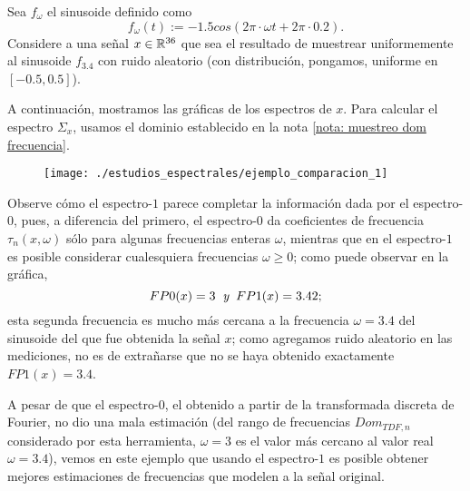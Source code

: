 \begin{ejemplo}
\label{ej: espectros comparacion}

Sea $f_{\omega}$
el sinusoide definido como
\begin{equation}
\label{eq: sinusoide eje}
f_{\omega}(t) := -1.5 cos (2 \pi \cdot \omega t + 2 \pi \cdot 0.2).
\end{equation}
Considere a una señal $x \in \mathbb{R}^{36}$ que sea el resultado
de muestrear uniformemente al sinusoide
$f_{3.4}$
con ruido aleatorio 
(con distribución, pongamos, uniforme en $[-0.5, 0.5]$).

A continuación, mostramos las gráficas
de los espectros de $x$. Para
calcular el espectro $\Sigma_{x}$,
usamos el dominio
establecido en la nota 
\ref{nota: muestreo dom frecuencia}.

\begin{figure}[H]
\centering
    \texttt{[image: ./estudios\_espectrales/ejemplo\_comparacion\_1]}
\end{figure}


Observe cómo el espectro-$1$ parece completar la información
dada por el espectro-$0$, pues, a diferencia del primero,
el espectro-$0$
da coeficientes de frecuencia $\tau_{n}(x, \omega)$ sólo
para algunas frecuencias enteras $\omega$, mientras que en el espectro-$1$
es posible considerar cualesquiera frecuencias $\omega \geq 0$; como puede observar
en la gráfica, 
\[
FP0 (x) = 3 \hspace{0.2cm} \textit{y} \hspace{0.2cm}
FP1 (x) = 3.42;
\]
esta segunda frecuencia es mucho más cercana a
la frecuencia $\omega =3.4$ del sinusoide del que
fue obtenida la señal $x$; como agregamos ruido
aleatorio en las mediciones, no 
es de extrañarse que no se haya
obtenido exactamente $FP1(x) = 3.4$.

A pesar de que el espectro-$0$, el obtenido a partir de la
transformada discreta de Fourier, no dio una mala estimación (del rango
de frecuencias $Dom_{TDF,n}$ considerado por esta herramienta,
$\omega =3$ es el valor más cercano al valor real $\omega = 3.4$), vemos en este
ejemplo que usando el espectro-$1$ es posible obtener mejores
estimaciones de frecuencias que modelen a la señal original. \\


\end{ejemplo}
